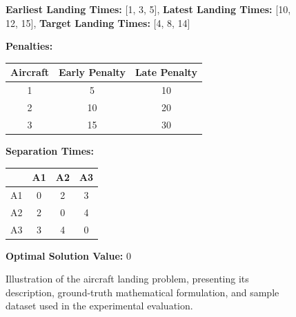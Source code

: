\documentclass[review,12pt]{elsarticle}
\begin{document}
\begin{figure}[htbp]
{{\begin{tcolorbox}
\begin{tcolorbox}[
    width=\linewidth,
    colframe=data, 
    colback=data!10, 
    title={\textbf{Sample Data}}, 
    fonttitle=\bfseries,
    halign title=center,
    boxrule=0.6pt,
    arc=2pt,
    left=1mm, right=1mm, top=0.5mm, bottom=0.5mm,
    before skip=0mm, after skip=0mm
]
\scriptsize
\textbf{Earliest Landing Times:} [1, 3, 5], \textbf{Latest Landing Times:} [10, 12, 15], \textbf{Target Landing Times:} [4, 8, 14]

\textbf{Penalties:}
\vspace{-6mm}
\begin{center}
\begin{tabular}{|c|c|c|}
\hline
\textbf{Aircraft} & \textbf{Early Penalty} & \textbf{Late Penalty} \\ \hline
1 & 5  & 10 \\ \hline
2 & 10 & 20 \\ \hline
3 & 15 & 30 \\ \hline
\end{tabular}
\end{center}
\vspace{-3mm}
\textbf{Separation Times:}
\vspace{-6mm}
\begin{center}
\begin{tabular}{|c|c|c|c|}
\hline
 & \textbf{A1} & \textbf{A2} & \textbf{A3} \\ \hline
A1 & 0 & 2 & 3 \\ \hline
A2 & 2 & 0 & 4 \\ \hline
A3 & 3 & 4 & 0 \\ \hline
\end{tabular}
\end{center}
\vspace{-3mm}
\textbf{Optimal Solution Value:} 0
\end{tcolorbox}

\end{tcolorbox}
} %
}
\caption{Illustration of the aircraft landing problem, presenting its description, ground-truth mathematical formulation, and sample dataset used in the experimental evaluation.}
\label{fig:Airlanding_problem}
\end{figure}

\newpage


\end{document}
